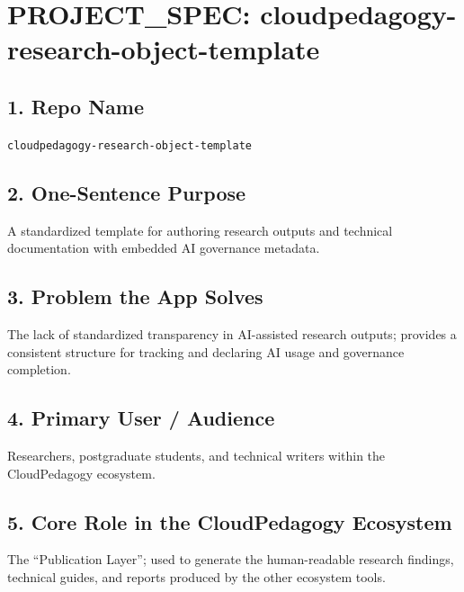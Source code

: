 \documentclass[
]{report}
\author{}
\date{}
\renewcommand*\contentsname{Table of contents}
\newcommand\contentsname{Table of contents}
\begin{document}
\renewcommand*\contentsname{Table of contents}
{
\hypersetup{linkcolor=}
\setcounter{tocdepth}{2}
\tableofcontents
}

\chapter{PROJECT\_SPEC:
cloudpedagogy-research-object-template}\label{project_spec-cloudpedagogy-research-object-template}

\section{1. Repo Name}\label{repo-name}

\texttt{cloudpedagogy-research-object-template}

\section{2. One-Sentence Purpose}\label{one-sentence-purpose}

A standardized template for authoring research outputs and technical
documentation with embedded AI governance metadata.

\section{3. Problem the App Solves}\label{problem-the-app-solves}

The lack of standardized transparency in AI-assisted research outputs;
provides a consistent structure for tracking and declaring AI usage and
governance completion.

\section{4. Primary User / Audience}\label{primary-user-audience}

Researchers, postgraduate students, and technical writers within the
CloudPedagogy ecosystem.

\section{5. Core Role in the CloudPedagogy
Ecosystem}\label{core-role-in-the-cloudpedagogy-ecosystem}

The ``Publication Layer''; used to generate the human-readable research
findings, technical guides, and reports produced by the other ecosystem
tools.
\end{document}
